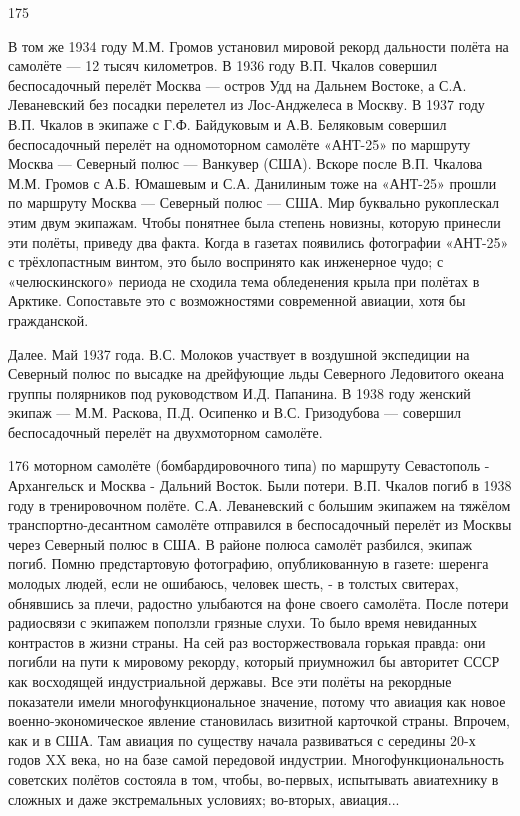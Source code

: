 175

В том же 1934 году М.М. Громов установил мировой рекорд дальности полёта на самолёте — 12 тысяч километров. В 1936 году В.П. Чкалов совершил беспосадочный перелёт Москва — остров Удд на Дальнем Востоке, а С.А. Леваневский без посадки перелетел из Лос-Анджелеса в Москву. В 1937 году В.П. Чкалов в экипаже с Г.Ф. Байдуковым и А.В. Беляковым совершил беспосадочный перелёт на одномоторном самолёте «АНТ-25» по маршруту Москва — Северный полюс — Ванкувер (США). Вскоре после В.П. Чкалова М.М. Громов с А.Б. Юмашевым и С.А. Данилиным тоже на «АНТ-25» прошли по маршруту Москва — Северный полюс — США. Мир буквально рукоплескал этим двум экипажам. Чтобы понятнее была степень новизны, которую принесли эти полёты, приведу два факта. Когда в газетах появились фотографии «АНТ-25» с трёхлопастным винтом, это было воспринято как инженерное чудо; с «челюскинского» периода не сходила тема обледенения крыла при полётах в Арктике. Сопоставьте это с возможностями современной авиации, хотя бы гражданской.

Далее. Май 1937 года. В.С. Молоков участвует в воздушной экспедиции на Северный полюс по высадке на дрейфующие льды Северного Ледовитого океана группы полярников под руководством И.Д. Папанина. В 1938 году женский экипаж — М.М. Раскова, П.Д. Осипенко и В.С. Гризодубова — совершил беспосадочный перелёт на двухмоторном самолёте.

176
моторном самолёте (бомбардировочного типа) по маршруту Севастополь - Архангельск и Москва - Дальний Восток. Были потери. В.П. Чкалов погиб в 1938 году в тренировочном полёте. С.А. Леваневский с большим экипажем на тяжёлом транспортно-десантном самолёте отправился в беспосадочный перелёт из Москвы через Северный полюс в США. В районе полюса самолёт разбился, экипаж погиб.
Помню предстартовую фотографию, опубликованную в газете: шеренга молодых людей, если не ошибаюсь, человек шесть, - в толстых свитерах, обнявшись за плечи, радостно улыбаются на фоне своего самолёта. После потери радиосвязи с экипажем поползли грязные слухи. То было время невиданных контрастов в жизни страны. На сей раз восторжествовала горькая правда: они погибли на пути к мировому рекорду, который приумножил бы авторитет СССР как восходящей индустриальной державы.
Все эти полёты на рекордные показатели имели многофункциональное значение, потому что авиация как новое военно-экономическое явление становилась визитной карточкой страны. Впрочем, как и в США. Там авиация по существу начала развиваться с середины 20-х годов XX века, но на базе самой передовой индустрии. Многофункциональность советских полётов состояла в том, чтобы, во-первых, испытывать авиатехнику в сложных и даже экстремальных условиях; во-вторых, авиация...

